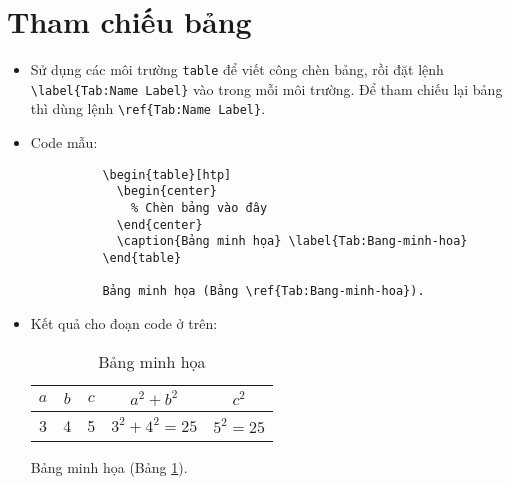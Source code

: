 \documentclass[12pt,a4paper]{article}
\begin{document}
\section{Tham chiếu bảng}
\begin{itemize}
  \item Sử dụng các môi trường \verb|table| để viết công chèn bảng, rồi đặt lệnh \verb|\label{Tab:Name Label}| vào trong mỗi môi trường. Để tham chiếu lại bảng thì dùng lệnh \verb|\ref{Tab:Name Label}|.
  \item Code mẫu:
        \begin{verbatim}
          \begin{table}[htp]
            \begin{center}
              % Chèn bảng vào đây
            \end{center}
            \caption{Bảng minh họa} \label{Tab:Bang-minh-hoa}
          \end{table}

          Bảng minh họa (Bảng \ref{Tab:Bang-minh-hoa}).
        \end{verbatim}
  \item Kết quả cho đoạn code ở trên:

        \begin{table}[!htp]
          \caption{Bảng minh họa} \label{Tab:Bang-minh-hoa}
          \begin{center}
            {
              \renewcommand{\arraystretch}{1.3}
              \begin{tabular}{|c|c|c|c|c|} \hline
                \(a\) & \(b\) & \(c\) & \(a^2 + b^2\)      & \(c^2\)      \\ \hline
                3     & 4     & 5     & \(3^2 + 4^2 = 25\) & \(5^2 = 25\) \\ \hline
              \end{tabular}
            }
          \end{center}
        \end{table}

        Bảng minh họa (Bảng \ref{Tab:Bang-minh-hoa}).
\end{itemize}
\end{document}
